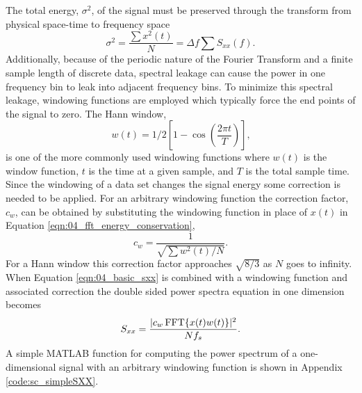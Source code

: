The total energy, $\sigma^2$, of the signal must be preserved through the transform from physical space-time to frequency space
\begin{equation}
  \sigma^2 = \frac{\sum x^2(t)}{N} = \Delta f\sum S_{xx}(f) \textrm{.}
  \label{eqn:04_fft_energy_conservation}
\end{equation}
Additionally, because of the periodic nature of the Fourier Transform and a finite sample length of discrete data, spectral leakage can cause the power in one frequency bin to leak into adjacent frequency bins.
To minimize this spectral leakage, windowing functions are employed which typically force the end points of the signal to zero.
The Hann window,
\begin{equation}
 w(t) = 1/2\left[1-\cos\left(\frac{2\pi t}{T}\right)\right] \textrm{,}
 \label{eqn:04_hann_window}
\end{equation}
is one of the more commonly used windowing functions \cite{Braun-2001-qhqBfvYz} where $w(t)$ is the window function, $t$ is the time at a given sample, and $T$ is the total sample time.
Since the windowing of a data set changes the signal energy some correction is needed to be applied.
For an arbitrary windowing function the correction factor, $c_w$, can be obtained by substituting the windowing function in place of $x(t)$ in Equation \ref{eqn:04_fft_energy_conservation},
\begin{equation}
 c_w = \frac{1}{\sqrt{\sum w^2(t)/N}} \textrm{.}
 \label{eqn:04_window_correction}
\end{equation}
For a Hann window this correction factor approaches $\sqrt{8/3}$ as $N$ goes to infinity.
When Equation \ref{eqn:04_basic_sxx} is combined with a windowing function and associated correction the double sided power spectra equation in one dimension becomes
\begin{equation}
 S_{xx} = \frac{|c_w\operatorname{FFT}\{x(t) w(t)\}|^2}{Nf_{s}} \textrm{.}
 \label{eqn:04_windowed_sxx}
\end{equation}
A simple MATLAB function for computing the power spectrum of a one-dimensional signal with an arbitrary windowing function is shown in Appendix \ref{code:sc_simpleSXX}.

